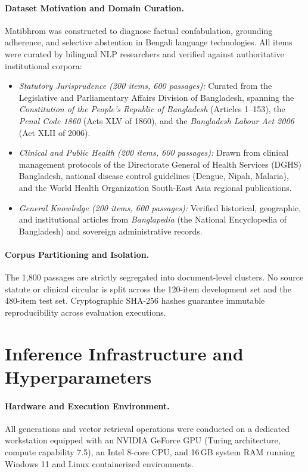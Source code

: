 \paragraph{Dataset Motivation and Domain Curation.} Matibhrom was constructed to diagnose factual confabulation, grounding adherence, and selective abstention in Bengali language technologies. All items were curated by bilingual NLP researchers and verified against authoritative institutional corpora:
\begin{itemize}[leftmargin=*]
    \item \emph{Statutory Jurisprudence (200 items, 600 passages):} Curated from the Legislative and Parliamentary Affairs Division of Bangladesh, spanning the \emph{Constitution of the People's Republic of Bangladesh} (Articles 1--153), the \emph{Penal Code 1860} (Acts XLV of 1860), and the \emph{Bangladesh Labour Act 2006} (Act XLII of 2006).
    \item \emph{Clinical and Public Health (200 items, 600 passages):} Drawn from clinical management protocols of the Directorate General of Health Services (DGHS) Bangladesh, national disease control guidelines (Dengue, Nipah, Malaria), and the World Health Organization South-East Asia regional publications.
    \item \emph{General Knowledge (200 items, 600 passages):} Verified historical, geographic, and institutional articles from \emph{Banglapedia} (the National Encyclopedia of Bangladesh) and sovereign administrative records.
\end{itemize}

\paragraph{Corpus Partitioning and Isolation.} The 1,800 passages are strictly segregated into document-level clusters. No source statute or clinical circular is split across the 120-item development set and the 480-item test set. Cryptographic SHA-256 hashes guarantee immutable reproducibility across evaluation executions.

\section{Inference Infrastructure and Hyperparameters}
\label{sec:appendix_compute}

\paragraph{Hardware and Execution Environment.} All generations and vector retrieval operations were conducted on a dedicated workstation equipped with an NVIDIA GeForce GPU (Turing architecture, compute capability 7.5), an Intel 8-core CPU, and 16\,GB system RAM running Windows 11 and Linux containerized environments. 

